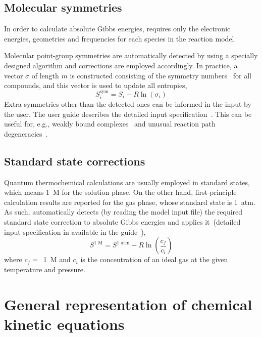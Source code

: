 \subsection{Molecular symmetries}%
\label{sec:mol-sym}

In order to calculate absolute Gibbs energies,
\overreact{} requires only the electronic energies,
geometries and frequencies for each species in the reaction model.

Molecular point-group symmetries are automatically detected by \overreact{} using a specially designed algorithm
and corrections are employed accordingly.
In practice,
a vector $\sigma$ of length $m$ is constructed consisting of the symmetry numbers~\cite{Fern_ndez_Ramos_2007,Gilson_2010} for all compounds,
and this vector is used to update all entropies,
% 
\begin{equation}
	S_i^\text{sym}
	= S_i - R \ln{\left( \sigma_i \right)}
\end{equation}
% 
Extra symmetries other than the detected ones can be informed in the input by the user.
The user guide describes the detailed input specification~\cite{overreactguideinput2022}.
This can be useful for,
e.g.,
weakly bound complexes~\cite{Gilson_2010} and unusual reaction path degeneracies~\cite{Fern_ndez_Ramos_2007}.

\subsection{Standard state corrections}

Quantum thermochemical calculations are usually employed in standard states,
which means 1~M for the solution phase.
On the other hand,
first-principle calculation results are reported for the gas phase,
whose standard state is 1~atm.
As such,
\overreact{} automatically detects (by reading the model input file)
the required standard state correction to absolute Gibbs energies
and applies it~(detailed input specification in available in the guide~\cite{overreactguideinput2022}),
% 
\begin{equation}
	S^\text{1~M} = S^\text{1~atm}
	- R \ln{\left( \frac{c_f}{c_i} \right)}
\end{equation}
% 
where $c_f =$~1~M and $c_i$ is the concentration of an ideal gas at the given temperature and pressure.

\section{General representation of chemical kinetic equations}%
\label{sec:kin-repr}


